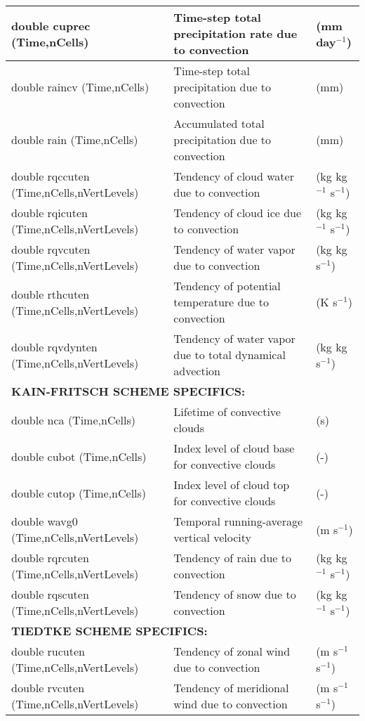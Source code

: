 {\small
\begin{longtable}{|p{2.0in} |p{3.0in} |p{1.0in} |}
\hline
        double cuprec (Time,nCells) & Time-step total precipitation rate due to convection & (mm day$^{-1}$) \\ \hline
        double raincv (Time,nCells)  & Time-step total precipitation due to convection & (mm) \\ \hline
        double rain (Time,nCells)      & Accumulated total precipitation due to convection & (mm) \\ \hline
        double rqccuten \hfil\break (Time,nCells,nVertLevels) & Tendency of cloud water due to convection &  (kg kg$^{-1}$ s$^{-1}$) \\ \hline
        double rqicuten \hfil\break (Time,nCells,nVertLevels) & Tendency of cloud ice due to convection & (kg kg$^{-1}$ s$^{-1}$) \\ \hline
        double rqvcuten \hfil\break (Time,nCells,nVertLevels) & Tendency of water vapor due to convection & (kg kg s$^{-1}$) \\ \hline
        double rthcuten \hfil\break (Time,nCells,nVertLevels) & Tendency of potential temperature due to convection & (K s$^{-1}$) \\ \hline
        double rqvdynten \hfil\break (Time,nCells,nVertLevels) & Tendency of water vapor due to total dynamical advection & (kg kg s$^{-1}$)\\ \hline
        \multicolumn{3}{|l|}{{\rule[-3mm]{0mm}{8mm}\bf KAIN-FRITSCH SCHEME SPECIFICS:} \hfill}\\ \hline
         double nca (Time,nCells) & Lifetime of convective clouds & (s) \\ \hline
        double cubot (Time,nCells) & Index level of cloud base for convective clouds & (-) \\ \hline
        double cutop (Time,nCells) & Index level of cloud top for convective clouds & (-) \\ \hline
        double wavg0 \hfil\break (Time,nCells,nVertLevels) & Temporal running-average vertical velocity & (m s$^{-1}$) \\ \hline
        double rqrcuten \hfil\break (Time,nCells,nVertLevels) & Tendency of rain due to convection &  (kg kg$^{-1}$ s$^{-1}$) \\ \hline
        double rqscuten \hfil\break (Time,nCells,nVertLevels) & Tendency of snow due to convection & (kg kg$^{-1}$ s$^{-1}$) \\ \hline
        \multicolumn{3}{|l|}{{\rule[-3mm]{0mm}{8mm}\bf TIEDTKE SCHEME SPECIFICS:} \hfill}\\ \hline
        double rucuten \hfil\break (Time,nCells,nVertLevels) & Tendency of zonal wind due to convection & (m s$^{-1}$ s$^{-1}$) \\ \hline
        double rvcuten \hfil\break (Time,nCells,nVertLevels) & Tendency of meridional wind due to convection & (m s$^{-1}$ s$^{-1}$) \\ \hline
\end{longtable}
}

